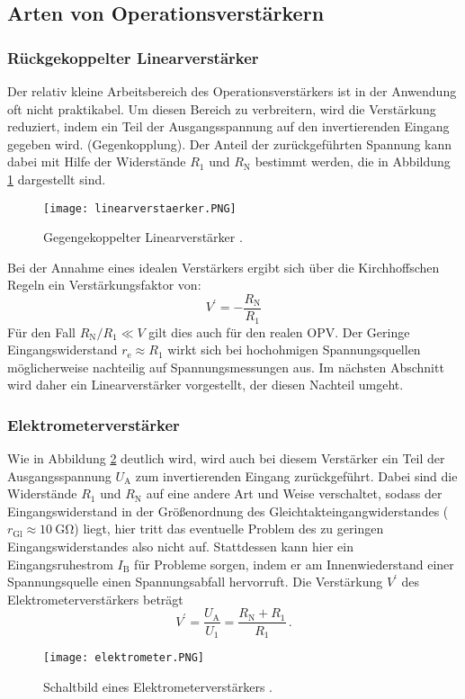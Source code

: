 \documentclass[
  bibliography=totoc,     %
  captions=tableheading,  %
  titlepage=firstiscover, %
]{scrartcl}
\begin{document}
\subsection{Arten von Operationsverstärkern}

\subsubsection{Rückgekoppelter Linearverstärker}
\label{subsubsec:rueck-linearverstärker}
Der relativ kleine Arbeitsbereich des Operationsverstärkers ist in der
Anwendung oft nicht praktikabel. Um diesen Bereich zu verbreitern, wird die
Verstärkung reduziert, indem ein Teil der Ausgangsspannung auf den
invertierenden Eingang gegeben wird. (Gegenkopplung).
Der Anteil der zurückgeführten Spannung kann dabei mit Hilfe der Widerstände
$R_1$ und $R_\text{N}$ bestimmt werden, die in Abbildung \ref{fig:linear}
dargestellt sind.
\begin{figure}[H]
    \centering
    \texttt{[image: linearverstaerker.PNG]}
    \caption{Gegengekoppelter Linearverstärker \cite{V51}.}
    \label{fig:linear}
\end{figure}
\noindent
Bei der Annahme eines idealen Verstärkers ergibt sich über die Kirchhoffschen Regeln
ein Verstärkungsfaktor von:
\begin{equation}
  V^\prime = -\frac{R_\text{N}}{R_1}
  \label{eqn:v'lingegen}
\end{equation}
Für den Fall $R_\text{N}/R_1 \ll V$ gilt dies auch für den realen OPV.
Der Geringe Eingangswiderstand $r_\text{e} \approx R_1$ wirkt sich bei
hochohmigen Spannungsquellen möglicherweise nachteilig auf Spannungsmessungen aus.
Im nächsten Abschnitt wird daher ein Linearverstärker vorgestellt, der diesen Nachteil
umgeht.

\subsubsection{Elektrometerverstärker}
\label{subsubsec:elektrometerverstärker}
Wie in Abbildung \ref{fig:elektrometer} deutlich wird, wird auch bei diesem
Verstärker ein Teil der Ausgangsspannung $U_\text{A}$ zum invertierenden
Eingang zurückgeführt. Dabei sind die Widerstände $R_1$ und $R_\text{N}$ auf
eine andere Art und Weise verschaltet, sodass der Eingangswiderstand in der
Größenordnung des Gleichtakteingangwiderstandes
($r_\text{Gl} \approx \SI{10}{\giga\ohm}$) liegt, hier tritt das eventuelle
Problem des zu geringen Eingangswiderstandes also nicht auf.
Stattdessen kann hier ein Eingangsruhestrom $I_\text{B}$ für Probleme sorgen,
indem er am Innenwiederstand einer Spannungsquelle einen Spannungsabfall hervorruft.
Die Verstärkung $V^\prime$ des Elektrometerverstärkers beträgt
\begin{equation*}
    V^\prime = \frac{U_\text{A}}{U_1} = \frac{R_\text{N} + R_1}{R_1}\,.
\end{equation*}
\begin{figure}[H]
    \centering
    \texttt{[image: elektrometer.PNG]}
    \caption{Schaltbild eines Elektrometerverstärkers \cite{V51}.}
    \label{fig:elektrometer}
\end{figure}
\end{document}
